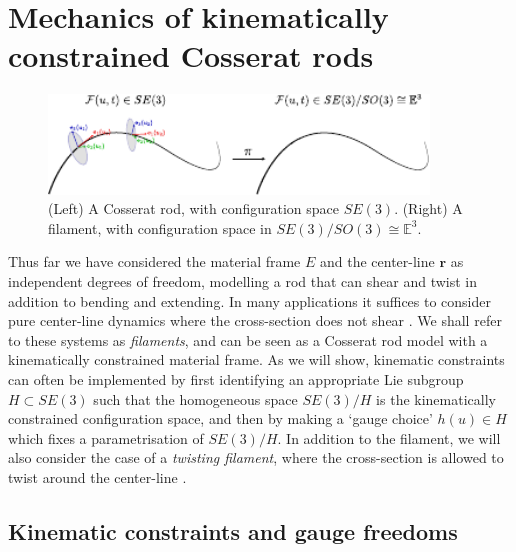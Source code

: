 \section{Mechanics of kinematically constrained Cosserat rods} \label{sec:Mechanics of kinematically constrained Cosserat rods}

\begin{figure}[t]
\centering
        \includegraphics[width=0.9\textwidth]{figs_part2/sec7.5_kinematically_constrained_cosserat_rods/cosserat_rod_to_filament.pdf}
        \caption{(Left) A Cosserat rod, with configuration space $SE(3)$. (Right) A filament, with configuration space in $SE(3)/SO(3) \cong \mathbb{E}^3$.}
        \label{fig:cosserat rod and filament}
\end{figure}

Thus far we have considered the material frame $E$ and the center-line $\mathbf{r}$ as independent degrees of freedom, modelling a rod that can shear and twist in addition to bending and extending. In many applications it suffices to consider pure center-line dynamics where the cross-section does not shear \citep{eloyKinematicsMostEfficient2012, tornbergSimulatingDynamicsInteractions2004, goldsteinNonlinearDynamicsStiff1995, sodaDynamicsStiffChains1973, nordgrenComputationMotionElastic1974, hasimotoSolitonVortexFilament1972}. We shall refer to these systems as \textit{filaments}, and can be seen as a Cosserat rod model with a kinematically constrained material frame. As we will show, kinematic constraints can often be implemented by first identifying an appropriate Lie subgroup $H \subset SE(3)$ such that the homogeneous space $SE(3) / H$ is the kinematically constrained configuration space, and then by making a `gauge choice' $h(u) \in H$ which fixes a parametrisation of $SE(3) / H$. In addition to the filament, we will also consider the case of a \textit{twisting filament}, where the cross-section is allowed to twist around the center-line \citep{powersDynamicsFilamentsMembranes2010, parkerDerivationNonlinearRod1984, goldsteinViscousNonlinearDynamics1998}.

\subsection{Kinematic constraints and gauge freedoms} \label{sec:Kinematic constraints and gauge freedoms}

